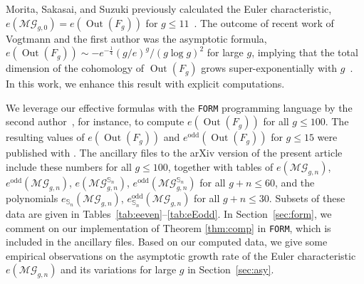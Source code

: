 \documentclass[oneside]{amsart}
\theoremstyle{remark}
\DeclareMathOperator{\SG}{{\mathbb S}}
\newcommand{\Out}{{\operatorname{Out}}}
\newcommand{\MG}{\mathcal{MG}}
\begin{document}
%

%
%
%
%
%
%
%
%
%
%
%
%
%

%

%
%
%

%

%
%
%
%
%
%

%

%
%
%
%

%
%

%

%

Morita, Sakasai, and Suzuki previously calculated the Euler characteristic, $e(\MG_{g,0}) = e(\Out(F_g))$ for $g\leq 11$~\cite{morita2015integral}. 
The outcome of recent work of Vogtmann and the first author was the asymptotic formula, $e(\Out(F_g)) \sim - e^{-\frac14} {\left(g/e\right)^g/(g \log g)^2}$ for large $g$, implying that the total dimension of the cohomology of $\Out(F_g)$ grows super-exponentially with $g$~\cite{BV2}. In this work, we enhance this result with explicit computations.

%
%
%
%
%
%

We leverage our effective formulas with the \texttt{FORM} programming language by the second author~\cite{Vermaseren:2000nd}, for instance, to compute $e(\Out(F_g))$ for all $g \leq 100$. The resulting values of $e(\Out(F_g))$ and $e^\mathrm{odd}(\Out(F_g))$ for $g\leq 15$ were published with \cite{BV2}.
The ancillary files to the arXiv version of the present article include these numbers for all $g\leq 100$, together with tables of $e(\MG_{g,n})$, $e^\mathrm{odd}(\MG_{g,n})$, $e(\MG_{g,n}^{\SG_n})$, $e^\mathrm{odd}(\MG_{g,n}^{\SG_n})$ for all $g+n \leq 60$, and the polynomials $e_{\SG_n}(\MG_{g,n})$, $e_{\SG_n}^\mathrm{odd}(\MG_{g,n})$ for all $g+n \leq 30$.
Subsets of these data are given in Tables~\ref{tab:eeven}--\ref{tab:eEodd}.
In Section~\ref{sec:form}, we comment on our implementation of Theorem \ref{thm:comp} in \texttt{FORM}, which is included in the ancillary files.
Based on our computed data, we give some empirical observations on the asymptotic growth rate of the Euler characteristic $e(\MG_{g,n})$ and its variations for large $g$ in Section~\ref{sec:asy}. 

%
%
%
%
%
%
%
%
%

%

%

%
%
\end{document}
